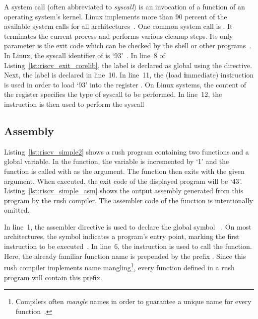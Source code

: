 A system call (often abbreviated to \emph{syscall}) is an invocation of a function of an operating system's kernel.
Linux implements more than 90 percent of the available system calls for all architectures~\cite[p.~3]{Love2013}.
One common system call is .
It terminates the current process and performs various cleanup steps.
Its only parameter is the exit code which can be checked by the shell or other programs~\cite[p.~148]{Love2013}.
In \riscv{} Linux, the syscall identifier of  is `93'~\cite{Torvalds1991}.
In line~8 of Listing~\ref{lst:riscv_exit_corelib}, the  label is declared as global using the  directive.
Next, the  label is declared in line~10.
In line~11, the  (\textbf{l}oad \textbf{i}mmediate) instruction is used in order to load `93' into the register .
On \riscv{} Linux systems, the content of the  register specifies the type of syscall to be performed.
In line~12, the  instruction is then used to perform the syscall~\cite[p.~23]{Patterson2017}

\subsection{\riscv{} Assembly}


Listing~\ref{lst:riscv_simple2} shows a rush program containing two functions and a global variable.
In the  function, the variable  is incremented by `1' and the  function is called with  as the argument.
The  function then exits with the given argument.
When executed, the exit code of the displayed program will be `43'.
Listing~\ref{lst:riscv_simple_asm} shows the output assembly%
%
%
generated from this program by the rush \riscv{} compiler.
The assembler code of the  function is intentionally omitted.

In line~1, the  assembler directive is used to declare the global symbol ~\cite[p.~36]{Patterson2017}.
On most architectures, the  symbol indicates a program's entry point, marking the first instruction to be executed~\cite[p.~19]{Zhirkov2017-wk}.
In line~6, the  instruction is used to call the  function.
Here, the already familiar  function name is prepended by the prefix .
Since this rush compiler implements name mangling\footnote{Compilers often \emph{mangle} names in order to guarantee a unique name for every function~\cite[pp.~119-120]{Levine2000}.},
every function defined in a rush program will contain this prefix.


